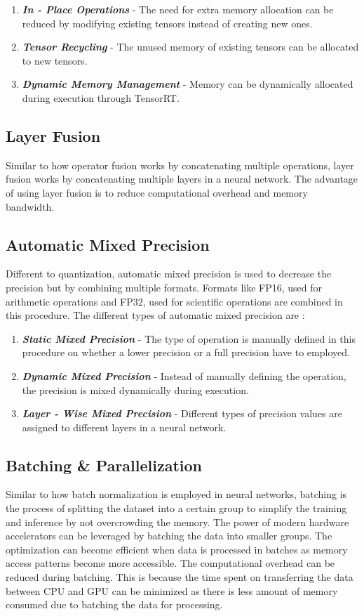 \documentclass[sigconf]{acmart}
\begin{document}
\begin{enumerate}
    \item \textbf{\textit{In - Place Operations}} - The need for extra memory allocation can be reduced by modifying existing tensors instead of creating new ones.
    \item \textbf{\textit{Tensor Recycling}} - The unused memory of existing tensors can be allocated to new tensors.
    \item \textbf{\textit{Dynamic Memory Management}} - Memory can be dynamically allocated during execution through TensorRT.
\end{enumerate}

\subsection{Layer Fusion}
Similar to how operator fusion works by concatenating multiple operations, layer fusion works by concatenating multiple layers in a neural network. The advantage of using layer fusion is to reduce computational overhead and memory bandwidth. 

\subsection{Automatic Mixed Precision}
Different to quantization, automatic mixed precision is used to decrease the precision but by combining multiple formats. Formats like FP16, used for arithmetic operations and FP32, used for scientific operations are combined in this procedure. The different types of automatic mixed precision are :

\begin{enumerate}
    \item \textbf{\textit{Static Mixed Precision}} - The type of operation is manually defined in this procedure on whether a lower precision or a full precision have to employed.
    \item \textbf{\textit{Dynamic Mixed Precision}} - Instead of manually defining the operation, the precision is mixed dynamically during execution.
    \item \textbf{\textit{Layer - Wise Mixed Precision}} - Different types of precision values are assigned to different layers in a neural network.
\end{enumerate}

\subsection{Batching \& Parallelization}
Similar to how batch normalization is employed in neural networks, batching is the process of splitting the dataset into a certain group to simplify the training and inference by not overcrowding the memory. The power of modern hardware accelerators can be leveraged by batching the data into smaller groups. The optimization can become efficient when data is processed in batches as memory access patterns become more accessible. The computational overhead can be reduced during batching. This is because the time spent on transferring the data between CPU and GPU can be minimized as there is less amount of memory consumed due to batching the data for processing.
\end{document}
